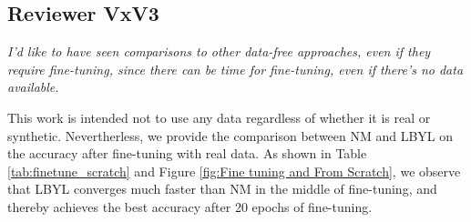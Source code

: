 








\subsection*{Reviewer VxV3}



\textit{I'd like to have seen comparisons to other data-free approaches, even if they require fine-tuning, since there can be time for fine-tuning, even if there's no data available.}


This work is intended not to use any data regardless of whether it is real or synthetic. Nevertherless, we provide the comparison between NM and LBYL on the accuracy after fine-tuning with real data. As shown in Table \ref{tab:finetune_scratch} and Figure \ref{fig:Fine tuning and From Scratch}, we observe that LBYL converges much faster than NM in the middle of fine-tuning, and thereby achieves the best accuracy after 20 epochs of fine-tuning.





